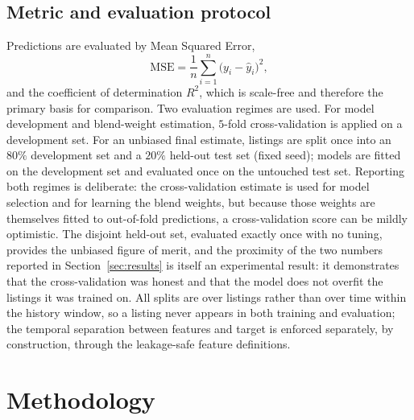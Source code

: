 \documentclass[review,12pt]{elsarticle}
\begin{document}
\subsection{Metric and evaluation protocol}
Predictions are evaluated by Mean Squared Error,
\begin{equation}
\text{MSE}=\frac{1}{n}\sum_{i=1}^{n}\bigl(y_i-\hat y_i\bigr)^2,
\label{eq:mse}
\end{equation}
and the coefficient of determination $R^2$, which is scale-free and therefore the
primary basis for comparison. Two evaluation regimes are used. For model
development and blend-weight estimation, $5$-fold cross-validation is applied on a
development set. For an unbiased final estimate, listings are split once into an
$80\%$ development set and a $20\%$ held-out test set (fixed seed); models are
fitted on the development set and evaluated once on the untouched test set.
Reporting both regimes is deliberate: the cross-validation estimate is used for
model selection and for learning the blend weights, but because those weights are
themselves fitted to out-of-fold predictions, a cross-validation score can be
mildly optimistic. The disjoint held-out set, evaluated exactly once with no
tuning, provides the unbiased figure of merit, and the proximity of the two
numbers reported in Section~\ref{sec:results} is itself an experimental result: it
demonstrates that the cross-validation was honest and that the model does not
overfit the listings it was trained on. All splits are over listings rather than
over time within the history window, so a listing never appears in both training
and evaluation; the temporal separation between features and target is enforced
separately, by construction, through the leakage-safe feature definitions.

\section{Methodology}
\label{sec:method}
\end{document}

